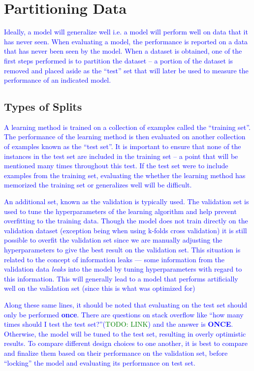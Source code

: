 \section{Partitioning Data}

\textcolor{blue}{Ideally, a model will generalize well i.e. a model will perform well on data that it has never seen. When evaluating a model, the performance is reported on a data that has never been seen by the model. When a dataset is obtained, one of the first steps performed is to partition the dataset -- a portion of the dataset is removed and placed aside as the ``test'' set that will later be used to measure the performance of an indicated model.}

\subsection{Types of Splits}

\textcolor{blue}{A learning method is trained on a collection of examples called the ``training set''. The performance of the learning method is then evaluated on another collection of examples known as the ``test set''. It is important to ensure that none of the instances in the test set are included in the training set -- a point that will be mentioned many times throughout this test. If the test set were to include examples from the training set, evaluating the whether the learning method has memorized the training set or generalizes well will be difficult.}

\textcolor{blue}{An additional set, known as the validation is typically used. The validation set is used to tune the hyperparameters of the learning algorithm and help prevent overfitting to the training data. Though the model does not train directly on the validation dataset (exception being when using k-folds cross validation) it is still possible to overfit the validation set since we are manually adjusting the hyperparameters to give the best result on the validation set. This situation is related to the concept of {information leaks} --- some information from the validation data \textit{leaks} into the model by tuning hyperparameters with regard to this information. This will generally lead to a  model that performs artificially well on the validation set (since this is what was optimized for)}

\textcolor{blue}{Along these same lines, it should be noted that evaluating on the test set should only be performed \textbf{once}. There are questions on stack overflow like ``how many times should I test the test set?''(\textcolor{green}{TODO: LINK}) and the answer is \textbf{ONCE}. Otherwise, the model will be tuned to the test set, resulting in overly optimistic results. To compare different design choices to one another, it is best to compare and finalize them based on their performance on the validation set, before ``locking'' the model and evaluating its performance on test set.}

